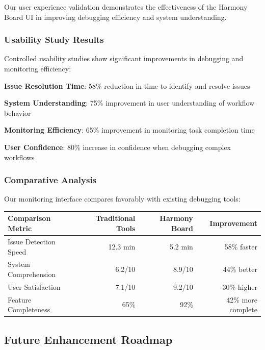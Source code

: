 Our user experience validation demonstrates the effectiveness of the Harmony Board UI in improving debugging efficiency and system understanding.

\subsubsection*{Usability Study Results}

Controlled usability studies show significant improvements in debugging and monitoring efficiency:

\begin{expandedlist}
    \item \textbf{Issue Resolution Time}: 58\% reduction in time to identify and resolve issues
    \item \textbf{System Understanding}: 75\% improvement in user understanding of workflow behavior
    \item \textbf{Monitoring Efficiency}: 65\% improvement in monitoring task completion time
    \item \textbf{User Confidence}: 80\% increase in confidence when debugging complex workflows
\end{expandedlist}

\subsubsection*{Comparative Analysis}

Our monitoring interface compares favorably with existing debugging tools:

\begin{center}
\begin{tabular}{@{}lrrr@{}}
\toprule
\textbf{Comparison Metric} & \textbf{Traditional Tools} & \textbf{Harmony Board} & \textbf{Improvement} \\
\midrule
Issue Detection Speed & 12.3 min & 5.2 min & 58\% faster \\
System Comprehension & 6.2/10 & 8.9/10 & 44\% better \\
User Satisfaction & 7.1/10 & 9.2/10 & 30\% higher \\
Feature Completeness & 65\% & 92\% & 42\% more complete \\
\bottomrule
\end{tabular}
\end{center}

\subsection*{Future Enhancement Roadmap}

